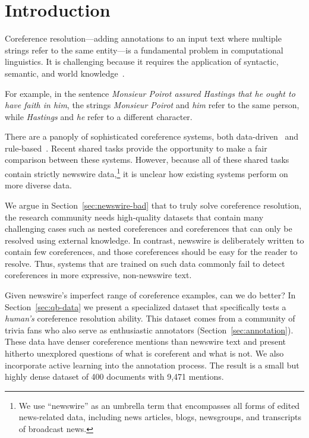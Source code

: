 

\section{Introduction}
\label{sec:intro}




Coreference resolution---adding annotations to an input text where multiple
strings refer to the same entity---is a fundamental problem in computational
linguistics. It is challenging because it requires the application of syntactic,
semantic, and world knowledge~\cite{ng2010supervised}.

For example, in the sentence \emph{Monsieur Poirot assured Hastings that he
  ought to have faith in him}, the strings \emph{Monsieur Poirot} and \emph{him}
refer to the same person, while \emph{Hastings} and \emph{he} refer to a
different character.

There are a panoply of sophisticated coreference systems, both
data-driven~\cite{fernandes2012latent,DurrettKlein2013,durrett2014joint,bjorkelund2014learning}
and
rule-based~\cite{Pradhan:2011:CST:2132936.2132937,lee2011stanford}. Recent
\conll{} shared tasks provide the opportunity to make a fair
comparison between these systems. However, because all of these shared
tasks contain strictly newswire data,\footnote{We use ``newswire'' as
  an umbrella term that encompasses all forms of edited news-related data,
  including news articles, blogs, newsgroups, and transcripts of
  broadcast news.} it is unclear how existing systems
perform on more diverse data.

We argue in Section~\ref{sec:newswire-bad} that to truly solve coreference
resolution, the research community needs high-quality datasets that contain many
challenging cases such as nested coreferences and coreferences that can only be
resolved using external knowledge. In contrast, newswire is deliberately
written to contain few coreferences, and those coreferences should be easy for
the reader to resolve. Thus, systems that are trained on such data
commonly fail to detect coreferences in more expressive, non-newswire text.

Given newswire's imperfect range of coreference examples, can we do
better?  In Section~\ref{sec:qb-data} we present a specialized dataset
that specifically tests a \emph{human's} coreference resolution
ability.  This dataset comes from a community of trivia fans who also
serve as enthusiastic annotators (Section~\ref{sec:annotation}). These
data have denser coreference mentions than newswire text and present
hitherto unexplored questions of what is coreferent and what is
not. We also incorporate active learning into the annotation
process. The result is a small but highly dense dataset of 400
documents with 9,471 mentions.

